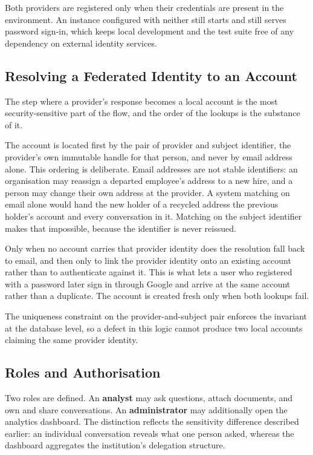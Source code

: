 Both providers are registered only when their credentials are present in the environment. An
instance configured with neither still starts and still serves password sign-in, which keeps
local development and the test suite free of any dependency on external identity services.

\subsection{Resolving a Federated Identity to an Account}

The step where a provider's response becomes a local account is the most security-sensitive
part of the flow, and the order of the lookups is the substance of it.

The account is located first by the pair of provider and subject identifier, the provider's
own immutable handle for that person, and never by email address alone. This ordering is
deliberate. Email addresses are not stable identifiers: an organisation may reassign a
departed employee's address to a new hire, and a person may change their own address at the
provider. A system matching on email alone would hand the new holder of a recycled address
the previous holder's account and every conversation in it. Matching on the subject
identifier makes that impossible, because the identifier is never reissued.

Only when no account carries that provider identity does the resolution fall back to email,
and then only to link the provider identity onto an existing account rather than to
authenticate against it. This is what lets a user who registered with a password later sign
in through Google and arrive at the same account rather than a duplicate. The account is
created fresh only when both lookups fail.

The uniqueness constraint on the provider-and-subject pair enforces the invariant at the
database level, so a defect in this logic cannot produce two local accounts claiming the same
provider identity.

\subsection{Roles and Authorisation}

Two roles are defined. An \textbf{analyst} may ask questions, attach documents, and own and
share conversations. An \textbf{administrator} may additionally open the analytics dashboard.
The distinction reflects the sensitivity difference described earlier: an individual
conversation reveals what one person asked, whereas the dashboard aggregates the institution's
delegation structure.

